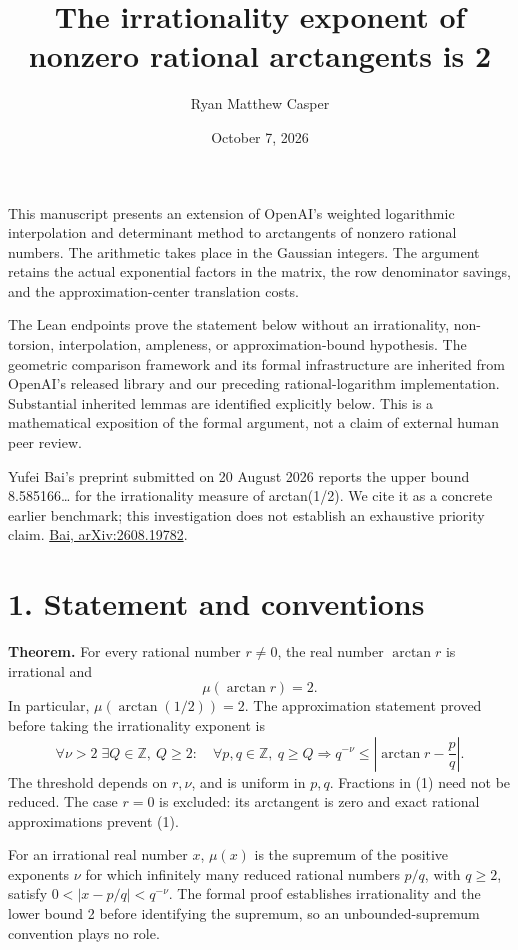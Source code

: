 \documentclass[11pt]{article}
\title{The irrationality exponent of nonzero rational arctangents is 2}
\author{Ryan Matthew Casper}
\date{October 7, 2026}
\begin{document}
\maketitle
This manuscript presents an extension of OpenAI's weighted logarithmic
interpolation and determinant method to arctangents of nonzero rational
numbers. The arithmetic takes place in the Gaussian integers. The
argument retains the actual exponential factors in the matrix, the row
denominator savings, and the approximation-center translation costs.

The Lean endpoints prove the statement below without an irrationality,
non-torsion, interpolation, ampleness, or approximation-bound
hypothesis. The geometric comparison framework and its formal
infrastructure are inherited from OpenAI's released library and our
preceding rational-logarithm implementation. Substantial inherited
lemmas are identified explicitly below. This is a mathematical
exposition of the formal argument, not a claim of external human peer
review.

Yufei Bai's preprint submitted on 20 August 2026 reports the upper bound
8.585166\ldots{} for the irrationality measure of arctan(1/2). We cite
it as a concrete earlier benchmark; this investigation does not
establish an exhaustive priority claim.
\href{https://arxiv.org/abs/2608.19782}{Bai, arXiv:2608.19782}.

\section{1. Statement and conventions}\label{statement-and-conventions}

\textbf{Theorem.} For every rational number \(r\ne0\), the real number
\(\arctan r\) is irrational and \[
\mu(\arctan r)=2.
\] In particular, \(\mu(\arctan(1/2))=2\). The approximation statement
proved before taking the irrationality exponent is \[
\forall\nu>2\;\exists Q\in\mathbb Z,\ Q\ge2:\quad
\forall p,q\in\mathbb Z,\ q\ge Q\Longrightarrow
q^{-\nu}\le\left|\arctan r-\frac pq\right|.
\tag{1}
\] The threshold depends on \(r,\nu\), and is uniform in \(p,q\).
Fractions in (1) need not be reduced. The case \(r=0\) is excluded: its
arctangent is zero and exact rational approximations prevent (1).

For an irrational real number \(x\), \(\mu(x)\) is the supremum of the
positive exponents \(\nu\) for which infinitely many reduced rational
numbers \(p/q\), with \(q\ge2\), satisfy \(0<|x-p/q|<q^{-\nu}\). The
formal proof establishes irrationality and the lower bound 2 before
identifying the supremum, so an unbounded-supremum convention plays no
role.
\end{document}
